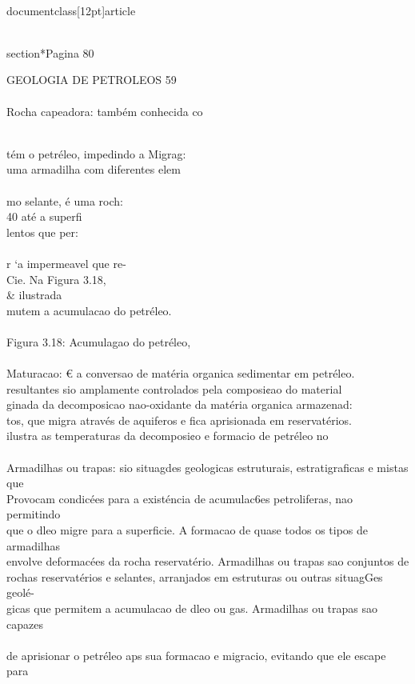 \\documentclass[12pt]{article}
\begin{document}
{\\section*{Pagina 80}

GEOLOGIA DE PETROLEOS 59\\
\\
Rocha capeadora: também conhecida co\\}\\
tém o petréleo, impedindo a Migrag:\\
uma armadilha com diferentes elem\\
\\
mo selante, é uma roch:\\
40 até a superfi\\
lentos que per:\\
\\
r ‘a impermeavel que re-\\
Cie. Na Figura 3.18, \\& ilustrada\\
mutem a acumulacao do petréleo.\\
\\
Figura 3.18: Acumulagao do petréleo,\\
\\
Maturacao: € a conversao de matéria organica sedimentar em petréleo.\\
resultantes sio amplamente controlados pela composi¢ao do material\\
ginada da decomposicao nao-oxidante da matéria organica armazenad:\\
tos, que migra através de aquiferos e fica aprisionada em reservatérios.\\
ilustra as temperaturas da decomposi¢o e formacio de petréleo no\\
\\
Armadilhas ou trapas: sio situagdes geologicas estruturais, estratigraficas e mistas que\\
Provocam condicées para a existéncia de acumulac6es petroliferas, nao permitindo\\
que o dleo migre para a superficie. A formacao de quase todos os tipos de armadilhas\\
envolve deformacées da rocha reservatério. Armadilhas ou trapas sao conjuntos de\\
rochas reservatérios e selantes, arranjados em estruturas ou outras situagGes geolé-\\
gicas que permitem a acumulacao de dleo ou gas. Armadilhas ou trapas sao capazes\\
\\
de aprisionar o petréleo aps sua formacao e migracio, evitando que ele escape para\\
\end{document}

